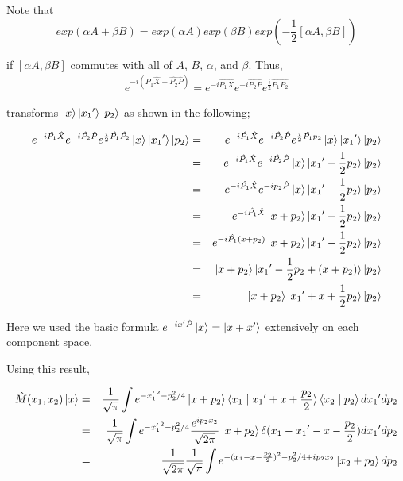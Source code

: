 \documentclass[uplatex]{jsarticle}
\begin{document}
Note that 
\begin{equation}
exp(\alpha A + \beta B) 
= exp(\alpha A) exp(\beta B) exp(-\frac{1}{2} [\alpha A, \beta B])
\end{equation}

if $[\alpha A, \beta B]$ commutes with all of $A$, $B$, $\alpha$, and
$\beta$. Thus, 
\begin{eqnarray}
e^{-i(\hat{P_1}\hat{X} + \hat{P_2}\hat{P})} = 
e^{-i\hat{P_1}\hat{X}} e^{-i\hat{P_2}\hat{P}} e^{\frac{i}{2} \hat{P_1}\hat{P_2}} 
\end{eqnarray}

transforms $\ket{x}\ket{{x_1}^\prime}\ket{p_2}$ as shown in the
following;

\begin{eqnarray}
e^{-i\hat{P_1}\hat{X}} e^{-i\hat{P_2}\hat{P}} 
e^{\frac{i}{2}\hat{P_1}\hat{P_2}}\ket{x}\ket{{x_1}^\prime}\ket{p_2}
&=&
e^{-i\hat{P_1}\hat{X}} e^{-i\hat{P_2}\hat{P}}
e^{\frac{i}{2}\hat{P_1} p_2}\ket{x}\ket{{x_1}^\prime}\ket{p_2}
\nonumber \\
&=& 
e^{-i\hat{P_1}\hat{X}} e^{-i\hat{P_2}\hat{P}}
\ket{x}\ket{{x_1}^\prime - \frac{1}{2}p_2}\ket{p_2}
\nonumber \\
&=&
e^{-i\hat{P_1}\hat{X}} e^{-i p_2\hat{P}}
\ket{x}\ket{{x_1}^\prime - \frac{1}{2}p_2}\ket{p_2}
\nonumber \\
&=&
e^{-i\hat{P_1}\hat{X}}
\ket{x + p_2}\ket{{x_1}^\prime - \frac{1}{2}p_2}\ket{p_2}
\nonumber \\
&=&
e^{-i\hat{P_1}(x + p_2)}
\ket{x + p_2}\ket{{x_1}^\prime - \frac{1}{2}p_2}\ket{p_2}
\nonumber \\
&=&
\ket{x + p_2}\ket{{x_1}^\prime - \frac{1}{2}p_2 + (x + p_2)}\ket{p_2}
\nonumber \\
&=&
\ket{x + p_2}\ket{{x_1}^\prime + x + \frac{1}{2}p_2}\ket{p_2}
\end{eqnarray}

Here we used the basic formula $e^{-ix^\prime\hat{P}}\ket{x} =
\ket{x + x^\prime}$ extensively on each component space.

Using this result,

\begin{eqnarray}
\hat{M}(x_1, x_2)\ket{x} &=& \frac{1}{\sqrt{\pi}}\int e^{-{x_1^\prime}^2
 - p_2^2 / 4}\ket{x+p_2}\braket{x_1 \mid {x_1}^\prime + x +
 \frac{p_2}{2}} \braket{x_2 \mid p_2} d{x_1}^\prime dp_2 \nonumber \\
&=&
\frac{1}{\sqrt{\pi}}\int e^{-{x_1^\prime}^2
 - p_2^2 / 4} \frac{e^{i p_2 x_2}}{\sqrt{2\pi}}\ket{x+p_2} \delta(x_1 - {x_1}^\prime - x -
 \frac{p_2}{2}) d{x_1}^\prime dp_2 \nonumber \\
&=&
\frac{1}{\sqrt{2\pi}}\frac{1}{\sqrt{\pi}}\int e^{-(x_1 - x -
\frac{p_2}{2})^2 - p_2^2 / 4 + i p_2 x_2} \ket{x_2 + p_2} dp_2
\end{eqnarray}
\end{document}
